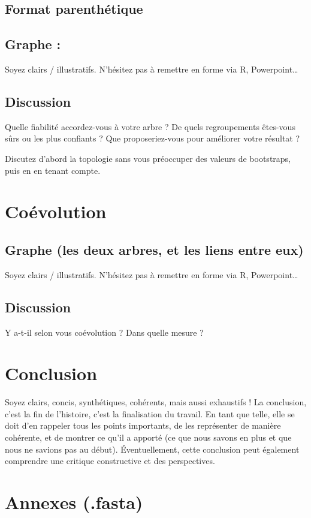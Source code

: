 \documentclass[a4paper, 11pt]{article}
\begin{document}
\subsection{Format parenthétique} 


\subsection{Graphe :}
Soyez clairs / illustratifs. N’hésitez pas à remettre en forme via R, Powerpoint…

\subsection{Discussion}
Quelle fiabilité accordez-vous à votre arbre ? De quels regroupements êtes-vous sûrs ou les plus confiants ? Que proposeriez-vous pour améliorer votre résultat ?

Discutez d’abord la topologie sans vous préoccuper des valeurs de bootstraps, puis en en tenant compte.
\section{Coévolution}

\subsection{Graphe (les deux arbres, et les liens entre eux)}
Soyez clairs / illustratifs. N’hésitez pas à remettre en forme via R, Powerpoint…

\subsection{Discussion}
Y a-t-il selon vous coévolution ? Dans quelle mesure ?
\section{Conclusion}
Soyez clairs, concis, synthétiques, cohérents, mais aussi exhaustifs ! La conclusion, c’est la fin de l’histoire, c’est la finalisation du travail. En tant que telle, elle se doit d’en rappeler tous les points importants, de les représenter de manière cohérente, et de montrer ce qu’il a apporté (ce que nous savons en plus et que nous ne savions pas au début). Éventuellement, cette conclusion peut également comprendre une critique constructive et des perspectives.

\printbibliography

\section{Annexes (.fasta)}
\end{document}
